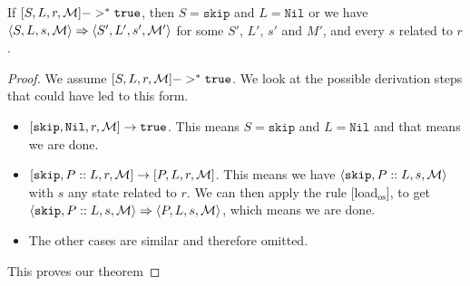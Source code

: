 \begin{theorem}
\label{progressb}
If $[ S, L, r, \mathcal{M} ] ->^* \texttt{true}$, then $S = \texttt{skip}$ and $L = \texttt{Nil}$ or we have $\langle S, L, s, \mathcal{M} \rangle \Rightarrow \langle S', L', s', \mathcal{M'} \rangle$ for some $S'$, $L'$, $s'$ and $M'$, and every $s$ related to $r$.
\end{theorem}

\begin{proof}
We assume $[ S, L, r, \mathcal{M} ] ->^* \texttt{true}$. We look at the possible derivation steps that could have led to this form. 
\begin{itemize}[noitemsep]
    \item $[ \texttt{skip}, \texttt{Nil}, r, \mathcal{M} ] \to \texttt{true}$. This means $S = \texttt{skip}$ and $L = \texttt{Nil}$ and that means we are done.
    \item $[ \texttt{skip}, P::L, r, \mathcal{M} ] \to [ P, L, r, \mathcal{M} ]$. This means we have $\langle \texttt{skip}, P::L, s, \mathcal{M} \rangle$ with $s$ any state related to $r$. We can then apply the rule [load$_{\textrm{os}}$], to get $\langle \texttt{skip}, P::L, s, \mathcal{M} \rangle \Rightarrow \langle P, L, s, \mathcal{M} \rangle$, which means we are done.
    \item The other cases are similar and therefore omitted.
\end{itemize}
This proves our theorem
\end{proof}





